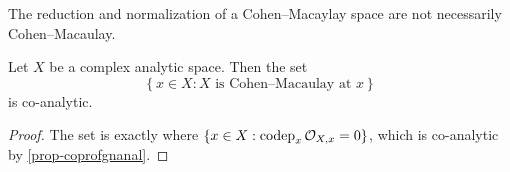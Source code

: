 The reduction and normalization of a Cohen--Macaylay space are not necessarily Cohen--Macaulay.

\begin{thm}
    Let $X$ be a complex analytic space. Then the set
    \[
        \left\{ x\in X: X\text{ is Cohen--Macaulay at }x \right\}  
    \]
    is co-analytic.
\end{thm}
\begin{proof}
    The set is exactly where $\{x\in X:\operatorname{codep}_x \mathcal{O}_{X,x}=0\}$, which is co-analytic by \cref{prop-coprofgnanal}.
\end{proof}

\printbibliography
